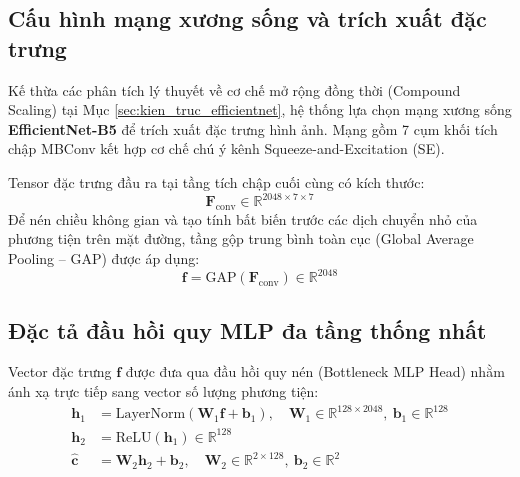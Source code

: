 \subsection{Cấu hình mạng xương sống và trích xuất đặc trưng}
Kế thừa các phân tích lý thuyết về cơ chế mở rộng đồng thời (Compound Scaling) tại Mục \ref{sec:kien_truc_efficientnet}, hệ thống lựa chọn mạng xương sống \textbf{EfficientNet-B5} để trích xuất đặc trưng hình ảnh. Mạng gồm 7 cụm khối tích chập MBConv kết hợp cơ chế chú ý kênh Squeeze-and-Excitation (SE).

Tensor đặc trưng đầu ra tại tầng tích chập cuối cùng có kích thước:
\begin{equation}
    \mathbf{F}_{\text{conv}} \in \mathbb{R}^{2048 \times 7 \times 7}
\end{equation}
Để nén chiều không gian và tạo tính bất biến trước các dịch chuyển nhỏ của phương tiện trên mặt đường, tầng gộp trung bình toàn cục (Global Average Pooling -- GAP) được áp dụng:
\begin{equation}
    \mathbf{f} = \text{GAP}(\mathbf{F}_{\text{conv}}) \in \mathbb{R}^{2048}
\end{equation}

\subsection{Đặc tả đầu hồi quy MLP đa tầng thống nhất}
Vector đặc trưng $\mathbf{f}$ được đưa qua đầu hồi quy nén (Bottleneck MLP Head) nhằm ánh xạ trực tiếp sang vector số lượng phương tiện:
\begin{align}
    \mathbf{h}_1 &= \text{LayerNorm}(\mathbf{W}_1 \mathbf{f} + \mathbf{b}_1), \quad \mathbf{W}_1 \in \mathbb{R}^{128 \times 2048}, \ \mathbf{b}_1 \in \mathbb{R}^{128} \\
    \mathbf{h}_2 &= \text{ReLU}(\mathbf{h}_1) \in \mathbb{R}^{128} \\
    \hat{\mathbf{c}} &= \mathbf{W}_2 \mathbf{h}_2 + \mathbf{b}_2, \quad \mathbf{W}_2 \in \mathbb{R}^{2 \times 128}, \ \mathbf{b}_2 \in \mathbb{R}^{2}
\end{align}

